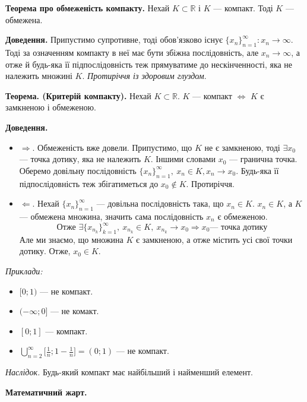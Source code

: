 \documentclass[12pt]{report}
\begin{document}
\textbf{Теорема про обмеженість компакту.} Нехай $K \subset \mathbb{R}$ і $K$ --- компакт. Тоді $K$ --- обмежена.

\textbf{Доведення.} Припустимо супротивне, тоді обов'язково існує $\{ x_n\}_{n=1}^{\infty} : x_n \to \infty$. Тоді за означенням компакту в неї має бути збіжна послідовність, але $x_n \to \infty$, а отже й будь-яка її підпослідовність теж прямуватиме до нескінченності, яка не належить множині $K$. \textit{Протиріччя із здоровим глуздом}.

\vspace{5mm}

\textbf{Теорема. (Критерій компакту).} Нехай $K \subset \mathbb{R}$. $K$ --- компакт $\Longleftrightarrow$ $K$ є замкненою і обмеженою.

\textbf{Доведення.} 
\begin{itemize}
    \item $\Longrightarrow$. Обмеженість вже довели. Припустимо, що $K$ не є замкненою, тоді $\exists x_0$ --- точка дотику, яка не належить $K$. Іншими словами $x_0$ --- гранична точка. Оберемо довільну послідовність $\{ x_n\}_{n=1}^{\infty},\ x_n \in K, x_n \to x_0$. Будь-яка її підпослідовність теж збігатиметься до $x_0 \notin K$. Протиріччя.
    \item $\Longleftarrow$. Нехай $\{ x_n\}_{n=1}^{\infty}$ --- довільна  послідовність така, що $x_n \in K$. $x_n \in K$, а $K$ --- обмежена множина, значить сама послідовність $x_n$ є обмеженою.
    $$\textrm{Отже } \exists \{ x_{n_k}\}_{k=1}^{\infty},\ x_{n_k} \in K,\ x_{n_k} \to x_0 \Longrightarrow x_0 \textrm{--- точка дотику}$$
    Але ми знаємо, що множина $K$ є замкненою, а отже містить усі свої точки дотику. Отже, $x_0 \in K$.
\end{itemize}

\textit{Приклади:}
\begin{itemize}
    \item $[0;1)$ --- не компакт.
    \item $(-\infty;0]$ --- не комакт.
    \item $[0;1]$ --- компакт.
    \item $\bigcup\limits_{n=2}^{\infty} \big[\frac{1}{n}; 1 - \frac{1}{n}\big] = (0;1)$ --- не компакт.
\end{itemize}

\textit{Наслідок.} Будь-який компакт має найбільший і найменший елемент.

\vspace{3mm}

\textbf{Математичний жарт.}
\end{document}
